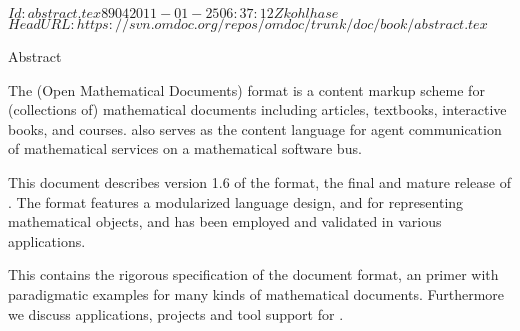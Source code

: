 \svnInfo $Id: abstract.tex 8904 2011-01-25 06:37:12Z kohlhase $
\svnKeyword $HeadURL: https://svn.omdoc.org/repos/omdoc/trunk/doc/book/abstract.tex $

\begin{omgroup}[display=flow]{Abstract}
\begin{omtext}[type=introduction]
The {\omdoc} (Open Mathematical Documents) format is a content markup scheme for
(collections of) mathematical documents including articles, textbooks, interactive
books, and courses.  {\omdoc} also serves as the content language for agent
communication of mathematical services on a mathematical software bus.
\end{omtext}

\begin{omtext}
This document describes version 1.6 of the {\omdoc} format, the final and mature
release of {}. The format features a modularized language design,
{\openmath} and {\mathml} for representing mathematical objects, and has been
employed and validated in various applications.
\end{omtext}

\begin{omtext}
This {\report} contains the rigorous specification of the {\omdoc} document format, an
{\omdoc} primer with paradigmatic examples for many kinds of mathematical documents.
Furthermore we discuss applications, projects and tool support for {\omdoc}.
\end{omtext}
\end{omgroup}

